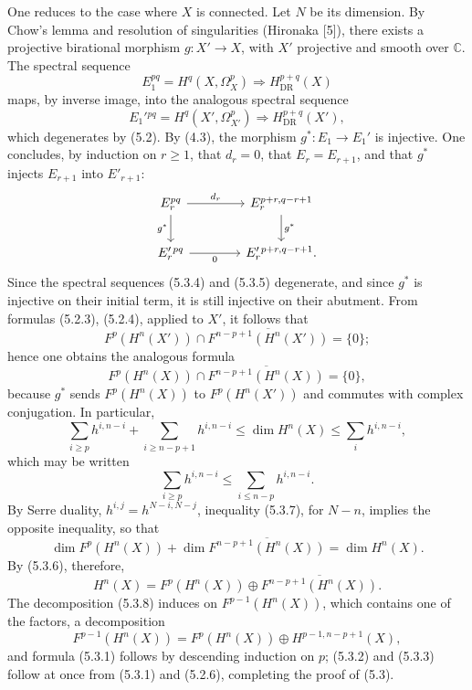 \documentclass[10pt]{article}
\providecommand{\C}{\mathbb C}
\providecommand{\DR}{\operatorname{DR}}
\begin{document}
One reduces to the case where $X$ is connected. Let $N$ be its dimension. By Chow's lemma and resolution of singularities (Hironaka [5]), there exists a projective birational morphism $g:X'\to X$, with $X'$ projective and smooth over $\C$. The spectral sequence
\[
\tag{5.3.4}
E_1^{pq}=H^q(X,\Omega_X^p)\Longrightarrow H_{\DR}^{p+q}(X)
\]
maps, by inverse image, into the analogous spectral sequence
\[
\tag{5.3.5}
E_1'{}^{pq}=H^q(X',\Omega_{X'}^p)\Longrightarrow H_{\DR}^{p+q}(X'),
\]
which degenerates by (5.2). By (4.3), the morphism $g^*:E_1\to E_1'$ is injective. One concludes, by induction on $r\ge1$, that $d_r=0$, that $E_r=E_{r+1}$, and that $g^*$ injects $E_{r+1}$ into $E'_{r+1}$:
\[
\begin{tikzcd}[column sep=4.0em,row sep=2.1em]
E_r^{pq} \arrow[r,"d_r"] \arrow[d,"g^*"'] & E_r^{p+r,q-r+1} \arrow[d,"g^*"]\\
E_r'{}^{pq} \arrow[r,"0"'] & E_r'{}^{p+r,q-r+1} .
\end{tikzcd}
\]
Since the spectral sequences (5.3.4) and (5.3.5) degenerate, and since $g^*$ is injective on their initial term, it is still injective on their abutment. From formulas (5.2.3), (5.2.4), applied to $X'$, it follows that
\[
F^p(H^n(X'))\cap\overline{F^{n-p+1}(H^n(X'))}=\{0\};
\]
hence one obtains the analogous formula
\[
\tag{5.3.6}
F^p(H^n(X))\cap\overline{F^{n-p+1}(H^n(X))}=\{0\},
\]
because $g^*$ sends $F^p(H^n(X))$ to $F^p(H^n(X'))$ and commutes with complex conjugation. In particular,
\[
\sum_{i\ge p}h^{i,n-i}+\sum_{i\ge n-p+1}h^{i,n-i}\le\dim H^n(X)\le\sum_i h^{i,n-i},
\]
which may be written
\[
\tag{5.3.7}
\sum_{i\ge p}h^{i,n-i}\le\sum_{i\le n-p}h^{i,n-i}.
\]
By Serre duality, $h^{i,j}=h^{N-i,N-j}$, inequality (5.3.7), for $N-n$, implies the opposite inequality, so that
\[
\dim F^p(H^n(X))+\dim \overline{F^{n-p+1}(H^n(X))}=\dim H^n(X).
\]
By (5.3.6), therefore,
\[
\tag{5.3.8}
H^n(X)=F^p(H^n(X))\oplus\overline{F^{n-p+1}(H^n(X))}.
\]
The decomposition (5.3.8) induces on $F^{p-1}(H^n(X))$, which contains one of the factors, a decomposition
\[
F^{p-1}(H^n(X))=F^p(H^n(X))\oplus H^{p-1,n-p+1}(X),
\]
and formula (5.3.1) follows by descending induction on $p$; (5.3.2) and (5.3.3) follow at once from (5.3.1) and (5.2.6), completing the proof of (5.3).
\end{document}

